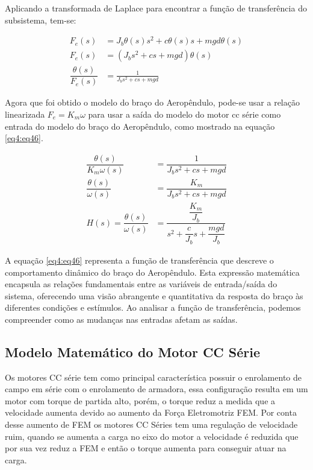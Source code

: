 Aplicando a transformada de Laplace para encontrar a função de transferência do subsistema, tem-se:

\begin{align}
    F_e(s) &= J_b\theta(s)s^2 + c\theta(s)s + mgd\theta(s) \label{eq4:eq41}\\
    F_e(s) &= (J_bs^2 + cs +mgd)\theta(s) \label{eq4:eq42}\\
    \dfrac{\theta(s)}{F_e(s)} &= \frac{1}{J_bs^2 + cs + mgd} \label{eq4:eq43}
\end{align}


Agora que foi obtido o modelo do braço do Aeropêndulo, pode-se usar a relação linearizada $F_e = K_m\omega$ para usar a saída do modelo do motor cc série como entrada do modelo do braço do Aeropêndulo, como mostrado na equação \ref{eq4:eq46}.

\begin{align}
    \dfrac{\theta(s)}{K_m\omega(s)} &= \dfrac{1}{J_bs^2 + cs +mgd} \label{eq4:eq44}\\
    \dfrac{\theta(s)}{\omega(s)} &= \dfrac{K_m}{J_bs^2 + cs +mgd} \label{eq4:eq45}\\
    H(s) = \dfrac{\theta(s)}{\omega(s)} &= \dfrac{\dfrac{K_m}{J_b}}{s^2 + \dfrac{c}{J_b}s +\dfrac{mgd}{J_b}} \label{eq4:eq46}
\end{align}


A equação \ref{eq4:eq46} representa a função de transferência que descreve o comportamento dinâmico do braço do Aeropêndulo. Esta expressão matemática encapsula as relações fundamentais entre as variáveis de entrada/saída do sistema, oferecendo uma visão abrangente e quantitativa da resposta do braço às diferentes condições e estímulos. Ao analisar a função de transferência, podemos compreender como as mudanças nas entradas afetam as saídas.


\subsection{Modelo Matemático do Motor CC Série}
\label{modelagem_motorccserie}

Os motores CC série tem como principal característica possuir o enrolamento de campo em série com o enrolamento de armadora, essa configuração resulta em um motor com torque de partida alto, porém, o torque reduz a medida que a velocidade aumenta devido ao aumento da Força Eletromotriz FEM. Por conta desse aumento de FEM os motores CC Séries tem uma regulação de velocidade ruim, quando se aumenta a carga no eixo do motor a velocidade é reduzida que por sua vez reduz a FEM e então o torque aumenta para conseguir atuar na carga.


